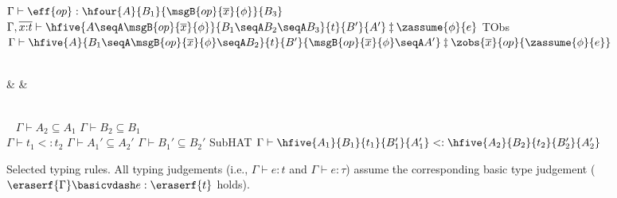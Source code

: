 \begin{figure}[!t]
{\mprooftr{105mm}
{
$\Gamma \vdash \eff{op} : \hfour{A}{B_1}{\msgB{op}{\overline{x}}{\phi}}{B_3}$ \quad
 $\Gamma, \overline{x{:}t} \vdash \hfive{A \seqA \msgB{op}{\overline{x}}{\phi}}{B_1 \seqA B_2 \seqA B_3}{t}{B'}{A'} \termsyn \zassume{\phi}{e}$}
{TObs}
{$\Gamma \vdash \hfive{A}{ B_1 \seqA \msgB{op}{\overline{x}}{\phi} \seqA B_2}{t}{B'}{\msgB{op}{\overline{x}}{\phi} \seqA A'} \termsyn \zobs{\overline{x}}{op}{\zassume{\phi}{e}}$}
\\ \ 
{\small
\begin{flalign*}
 & & 
\end{flalign*}
}
\\ \
\mprooftr{80mm}
{$\Gamma \vdash A_2 \subseteq A_1$ \quad
$\Gamma \vdash B_2 \subseteq B_1$ \\
$\Gamma \vdash t_1 <: t_2$ \quad
$\Gamma \vdash A_1' \subseteq A_2'$ \quad
$\Gamma \vdash B_1' \subseteq B_2'$ \quad}
{SubHAT}
{$\Gamma \vdash \hfive{A_1}{B_1}{t_1}{B_1'}{A_1'} <: \hfive{A_2}{B_2}{t_2}{B_2'}{A_2'}$}
}
\vspace*{-.1in}
\caption{Selected typing rules. All typing judgements (i.e.,
  {\small$\Gamma \vdash e : t$} and {\small$\Gamma \vdash e : \tau$})
  assume the corresponding basic type judgement
  ({\small$\eraserf{\Gamma} \basicvdash e : \eraserf{t}$} holds).%
}
\label{fig:selected-typing-rules}
\vspace*{-.2in}
\end{figure}